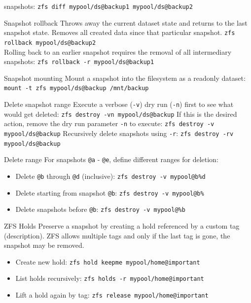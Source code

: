\documentclass[10pt,landscape,letter]{article}
\begin{document}
\begin{multicols}{3}
\begin{Description}
          snapshots:
          \texttt{zfs diff mypool/ds@backup1 mypool/ds@backup2}
    \item[Snapshot rollback] Throws away the current dataset state and returns to
      the last snapshot state. Removes all created data since that particular snapshot.
      \texttt{zfs rollback mypool/ds@backup2}\\
      Rolling back to an earlier snapshot requires the removal of all intermediary snapshots:
      \texttt{zfs rollback -r mypool/ds@backup1}
    \item[Snapshot mounting] Mount a snapshot into the filesystem as a readonly dataset:
      \texttt{mount -t zfs mypool/ds@backup /mnt/backup}
    \item[Delete snapshot range] Execute a verbose (\texttt{-v}) dry run (\texttt{-n}) first to see
      what would get deleted:
      \texttt{zfs destroy -vn mypool/ds@backup}
      If this is the desired action, remove the dry run parameter \texttt{-n} to
      execute: \texttt{zfs destroy -v mypool/ds@backup} Recursively delete snapshots using \texttt{-r}: \texttt{zfs destroy -rv mypool/ds@backup}\\
    \item[Delete range] For snapshots \verb|@a| - \verb|@e|, define different ranges for deletion:
	\begin{itemize}
    \item Delete \verb|@b| through \verb|@d| (inclusive): \texttt{zfs destroy -v mypool@b\%d}
    \item Delete starting from snapshot \verb|@b|: \texttt{zfs destroy -v mypool@b\%}
    \item Delete snapshots before \verb|@b|: \verb|zfs destroy -v mypool@%b|
	\end{itemize}
\item[ZFS Holds] Preserve a snapshot by creating a hold referenced by a custom
  tag (description). ZFS allows multiple tags and only if the last tag is gone,
      the snapshot may be removed.
	\begin{itemize}
    \item Create new hold: \texttt{zfs hold keepme mypool/home@important}
    \item List holds recursively: \texttt{zfs holds -r mypool/home@important}
    \item Lift a hold again by tag: \texttt{zfs release mypool/home@important}
	\end{itemize}
	\end{Description}


\end{multicols}
\end{document}
